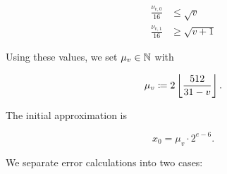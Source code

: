 \begin{align}
    \frac{\nu_{v,0}}{16} &\le \sqrt{v} \nonumber\\
    \frac{\nu_{v,1}}{16} &\ge \sqrt{v+1}
    \label{eq:app_hyper4_v_bound}
\end{align}

\noindent
Using these values,
we set $\mu_{v}\in\mathbb{N}$ with

\begin{equation}
    \mu_{v} \coloneqq{} 2\left\lfloor \frac{512}{31-v} \right\rfloor.
\end{equation}

The initial approximation is

\begin{equation}
    x_{0} = \mu_{v}\cdot2^{e-6}.
\end{equation}

\noindent
We separate error calculations into two cases:

